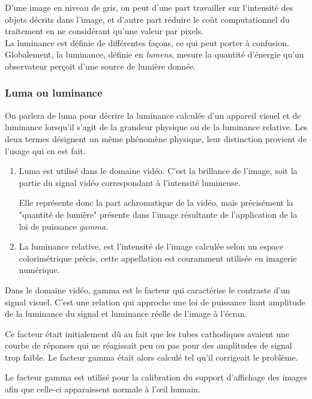 \documentclass[a4paper,11pt]{report}
\begin{document}
D'une image en niveau de gris, on peut d'une part travailler sur l'intensité des objets décrits dans l'image, et d'autre part réduire le coût computationnel du traitement en ne considérant qu'une valeur par pixels.\\

La luminance est définie de différentes façons, ce qui peut porter à confusion. Globalement, la luminance, définie en \textit{lumens}, mesure la quantité d'énergie qu'un observateur perçoit d'une source de lumière donnée.  
\subsubsection{Luma ou luminance}
On parlera de luma pour décrire la luminance calculée d'un appareil visuel et de luminance lorsqu'il s'agit de la grandeur physique ou de la luminance relative.
Les deux termes désignent un même phénomène physique, leur distinction provient de l'usage qui en est fait.
 
\begin{enumerate}
\item Luma est utilisé dans le domaine vidéo. C'est la brillance de l'image, soit la partie du signal vidéo correspondant à l'intensité lumineuse.  

Elle représente donc la part achromatique de la vidéo, mais précisément la "quantité de lumière" présente dans l'image résultante de l'application de la loi de puissance \textit{gamma}.\\

\item La luminance relative, est l'intensité de l'image calculée selon un espace colorimétrique précis, cette appellation est couramment utilisée en imagerie numérique.\\
\end{enumerate}

Dans le domaine vidéo, gamma est le facteur qui caractérise le contraste d'un signal visuel. C'est une relation qui approche une loi de puissance liant amplitude de la luminance du signal et luminance réelle de l'image à l'écran. 

Ce facteur était initialement dû au fait que les tubes cathodiques avaient une courbe de réponses qui ne réagissait peu ou pas pour des amplitudes de signal trop faible. Le facteur gamma était alors calculé tel qu'il corrigeait le problème. 

Le facteur gamma est utilisé pour la calibration du support d'affichage des images afin que celle-ci apparaissent normale à l'œil humain.\\
\end{document}
